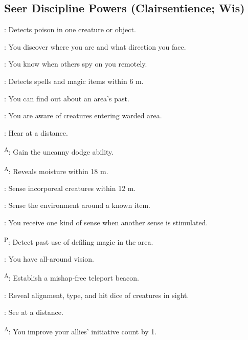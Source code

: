 \subsection{Seer Discipline Powers {\normalsize(Clairsentience; Wis)}}
\begin{enumerate*}
\item {}: Detects poison in one creature or object.

      : You discover where you are and what direction you face.

      : You know when others spy on you remotely.

\item {}: Detects spells and magic items within 6 m.

      : You can find out about an area's past.

      : You are aware of creatures entering warded area.

\item {}: Hear at a distance.

      \textsuperscript{A}: Gain the uncanny dodge ability.

      \textsuperscript{A}: Reveals moisture within 18 m.

      : Sense incorporeal creatures within 12 m.

      : Sense the environment around a known item.

      : You receive one kind of sense when another sense is stimulated.

      \textsuperscript{P}: Detect past use of defiling magic in the area.

      : You have all-around vision.

\item {}\textsuperscript{A}: Establish a mishap-free teleport beacon.

      : Reveal alignment, type, and hit dice of creatures in sight.

      : See at a distance.

      \textsuperscript{A}: You improve your allies' initiative count by 1.


\end{enumerate*}

